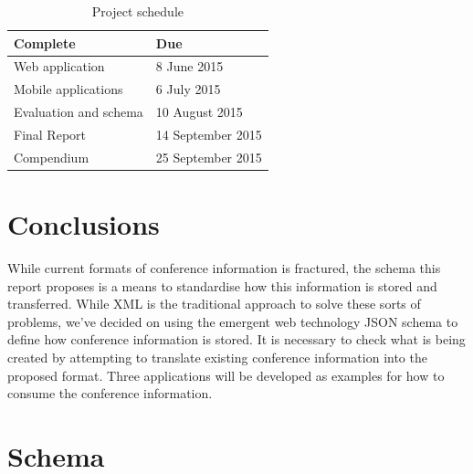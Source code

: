 \documentclass{article}
\begin{document}
\begin{table}[h]
\begin{tabular}{ll}
\hline
Complete              & Due               \\ \hline
Web application       & 8 June 2015       \\
Mobile applications   & 6 July 2015       \\
Evaluation and schema & 10 August 2015    \\
Final Report          & 14 September 2015 \\
Compendium            & 25 September 2015
\end{tabular}
\caption{Project schedule}
\end{table}

\section{Conclusions}
While current formats of conference information is fractured, the schema this report proposes is a means to standardise how this information is stored and transferred. While XML is the traditional approach to solve these sorts of problems, we've decided on using the emergent web technology JSON schema to define how conference information is stored. It is necessary to check what is being created by attempting to translate existing conference information into the proposed format. Three applications will be developed as examples for how to consume the conference information.




\onecolumn
\appendix
\section{Schema}
% 

\end{document}
